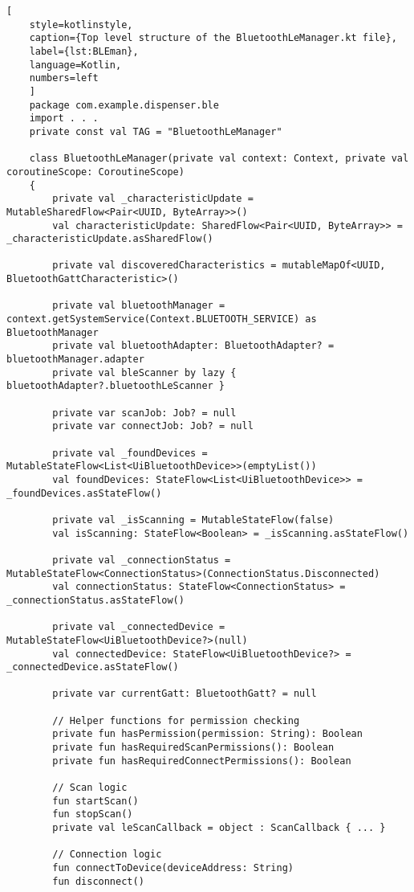 \begin{lstlisting}[
	style=kotlinstyle,
	caption={Top level structure of the BluetoothLeManager.kt file},
	label={lst:BLEman},
	language=Kotlin,
	numbers=left
	]
	package com.example.dispenser.ble
	import . . .
	private const val TAG = "BluetoothLeManager"
	
	class BluetoothLeManager(private val context: Context, private val coroutineScope: CoroutineScope)
	{
		private val _characteristicUpdate = MutableSharedFlow<Pair<UUID, ByteArray>>()
		val characteristicUpdate: SharedFlow<Pair<UUID, ByteArray>> = _characteristicUpdate.asSharedFlow()
		
		private val discoveredCharacteristics = mutableMapOf<UUID, BluetoothGattCharacteristic>()
		
		private val bluetoothManager = context.getSystemService(Context.BLUETOOTH_SERVICE) as BluetoothManager
		private val bluetoothAdapter: BluetoothAdapter? = bluetoothManager.adapter
		private val bleScanner by lazy { bluetoothAdapter?.bluetoothLeScanner }
		
		private var scanJob: Job? = null
		private var connectJob: Job? = null
		
		private val _foundDevices = MutableStateFlow<List<UiBluetoothDevice>>(emptyList())
		val foundDevices: StateFlow<List<UiBluetoothDevice>> = _foundDevices.asStateFlow()
		
		private val _isScanning = MutableStateFlow(false)
		val isScanning: StateFlow<Boolean> = _isScanning.asStateFlow()
		
		private val _connectionStatus = MutableStateFlow<ConnectionStatus>(ConnectionStatus.Disconnected)
		val connectionStatus: StateFlow<ConnectionStatus> = _connectionStatus.asStateFlow()
		
		private val _connectedDevice = MutableStateFlow<UiBluetoothDevice?>(null)
		val connectedDevice: StateFlow<UiBluetoothDevice?> = _connectedDevice.asStateFlow()
		
		private var currentGatt: BluetoothGatt? = null
		
		// Helper functions for permission checking
		private fun hasPermission(permission: String): Boolean
		private fun hasRequiredScanPermissions(): Boolean
		private fun hasRequiredConnectPermissions(): Boolean
		
		// Scan logic
		fun startScan()
		fun stopScan()
		private val leScanCallback = object : ScanCallback { ... }
		
		// Connection logic
		fun connectToDevice(deviceAddress: String)
		fun disconnect()
		

\end{lstlisting}
